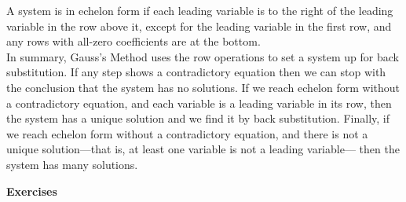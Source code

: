 \documentclass{article}
\begin{document}
A system is in echelon form if each leading variable is to the right of the leading variable in the row above it, except for the leading variable in the first row, and any rows with all-zero coefficients are at the bottom.\\

In summary, Gauss’s Method uses the row operations to set a system up for
back substitution. If any step shows a contradictory equation then we can stop
with the conclusion that the system has no solutions. If we reach echelon form
without a contradictory equation, and each variable is a leading variable in its
row, then the system has a unique solution and we find it by back substitution.
Finally, if we reach echelon form without a contradictory equation, and there is
not a unique solution—that is, at least one variable is not a leading variable—
then the system has many solutions.

\newpage

{\bf{}Exercises}
\end{document}
